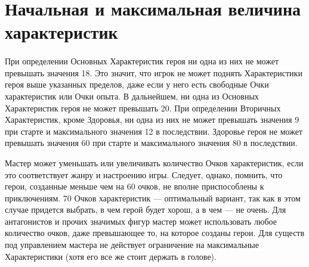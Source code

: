 \section{Начальная и максимальная величина характеристик}
\paragraph{}
{\color{orange}При определении Основных Характеристик героя ни одна из них не может превышать значения 18. Это значит, что игрок не может поднять Характеристики героя выше указанных пределов, даже если у него есть свободные Очки характеристик или Очки опыта. В дальнейшем, ни одна из Основных Характеристик героя не может превышать 20. 
\newline При определении Вторичных Характеристик, кроме Здоровья, ни одна из них не может превышать значения 9 при старте и максимального значения 12 в последствии.
\newline Здоровье героя не может превышать значения 60 при старте и максимального значения 80 в последствии.}

\newline Мастер может уменьшать или увеличивать количество Очков характеристик, если это соответствует жанру и настроению игры. Следует, однако, помнить, что герои, созданные меньше чем на 60 очков, не вполне приспособлены к приключениям. 70 Очков характеристик — оптимальный вариант, так как в этом случае придется выбрать, в чем герой будет хорош, а в чем — не очень.
\newline Для антагонистов и прочих значимых фигур мастер может использовать любое количество очков, даже превышающее то, на которое созданы герои. Для существ под управлением мастера не действует ограничение на максимальные Характеристики (хотя его все же стоит держать в голове).

